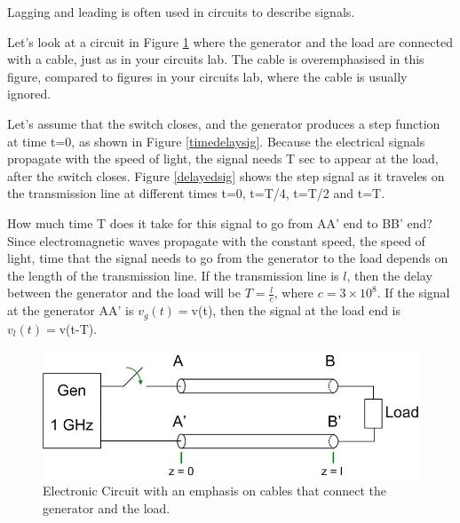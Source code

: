 \documentclass{ximera}
\begin{document}
\begin{example}

Lagging and leading is often used in circuits to describe signals.

Let's look at a circuit in Figure \ref{elcric} where the generator and the load are connected with a cable, just as in your circuits lab. The cable is overemphasised in this figure, compared to figures in your circuits lab, where the cable is usually ignored. 


Let's assume that the switch closes, and the generator produces a step function at time t=0, as shown in Figure  \ref{timedelaysig}. Because the electrical signals propagate with the speed of light, the signal needs T sec to appear at the load, after the switch closes. Figure \ref{delayedsig} shows the step signal as it traveles on the transmission line at different times t=0, t=T/4, t=T/2 and t=T.



 How much time T does it take for this signal to go from AA' end to BB' end? 
Since electromagnetic waves propagate with the constant speed, the speed of light, time that  the signal needs to go from the generator to  the load  depends  on the length of the transmission line. If the transmission line is $l$, then the delay between the generator and the load will be  $T=\frac{l}{c}$, where $c=3\times 10^8$. If the signal at the generator AA' is $v_g(t)=$v(t), then the signal at the load end is $v_l(t)=$v(t-T). 



\begin{figure}[htbp]
\begin{center}
\includegraphics[scale=0.5]{../jpg/generaltransmissionlinecircuit1.jpg}
\end{center}
\caption{Electronic Circuit with an emphasis on cables that connect the generator and the load.}
\label{elcric}
\end{figure}





\end{example}
\end{document}
